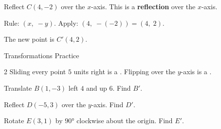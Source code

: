 \begin{stepExample}{Reflect $C(4, -2)$ over the $x$-axis.}
     This is a \textbf{reflection} over the $x$-axis.

     Rule: $(x,\; -y)$. Apply: $(4,\; -(-2)) = (4,\; 2)$.

     The new point is $C'(4, 2)$.
\end{stepExample}


\newpage
\begin{stepPractice}{Transformations Practice}
    \resetProblems

    \begin{multicols}{2}
    \prob Sliding every point $5$ units right is a \answerBlank[2.5cm].
    \prob Flipping over the $y$-axis is a \answerBlank[2.5cm].
    \end{multicols}

    \prob Translate $B(1, -3)$ left $4$ and up $6$. Find $B'$. \answerBlank[2.5cm]

    \prob Reflect $D(-5, 3)$ over the $y$-axis. Find $D'$. \answerBlank[2.5cm]

    \prob Rotate $E(3, 1)$ by $90°$ clockwise about the origin. Find $E'$. \answerBlank[2.5cm]

\end{stepPractice}
